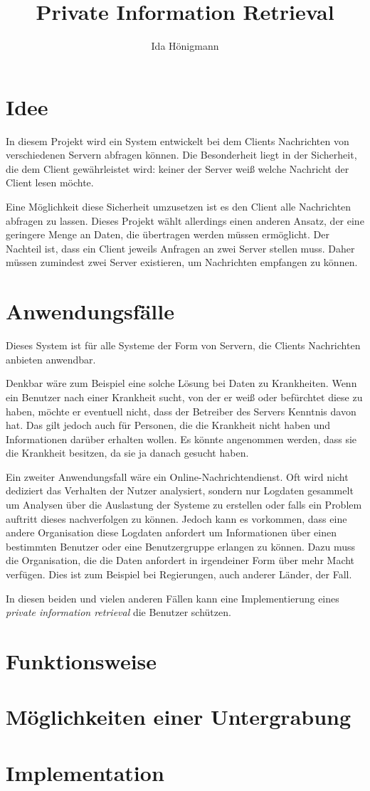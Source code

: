 \documentclass[]{article}
\title{Private Information Retrieval}
\author{Ida Hönigmann}
\begin{document}
\maketitle

\begin{abstract}

\end{abstract}

\section{Idee}
In diesem Projekt wird ein System entwickelt bei dem Clients Nachrichten von verschiedenen Servern abfragen können. Die Besonderheit liegt in der Sicherheit, die dem Client gewährleistet wird: keiner der Server weiß welche Nachricht der Client lesen möchte.

Eine Möglichkeit diese Sicherheit umzusetzen ist es den Client alle Nachrichten abfragen zu lassen. Dieses Projekt wählt allerdings einen anderen Ansatz, der eine geringere Menge an Daten, die übertragen werden müssen ermöglicht. Der Nachteil ist, dass ein Client jeweils Anfragen an zwei Server stellen muss. Daher müssen zumindest zwei Server existieren, um Nachrichten empfangen zu können.

\section{Anwendungsfälle}
Dieses System ist für alle Systeme der Form von Servern, die Clients Nachrichten anbieten anwendbar.

Denkbar wäre zum Beispiel eine solche Lösung bei Daten zu Krankheiten. Wenn ein Benutzer nach einer Krankheit sucht, von der er weiß oder befürchtet diese zu haben, möchte er eventuell nicht, dass der Betreiber des Servers Kenntnis davon hat. Das gilt jedoch auch für Personen, die die Krankheit nicht haben und Informationen darüber erhalten wollen. Es könnte angenommen werden, dass sie die Krankheit besitzen, da sie ja danach gesucht haben.

Ein zweiter Anwendungsfall wäre ein Online-Nachrichtendienst. Oft wird nicht dediziert das Verhalten der Nutzer analysiert, sondern nur Logdaten gesammelt um Analysen über die Auslastung der Systeme zu erstellen oder falls ein Problem auftritt dieses nachverfolgen zu können. Jedoch kann es vorkommen, dass eine andere Organisation diese Logdaten anfordert um Informationen über einen bestimmten Benutzer oder eine Benutzergruppe erlangen zu können. Dazu muss die Organisation, die die Daten anfordert in irgendeiner Form über mehr Macht verfügen. Dies ist zum Beispiel bei Regierungen, auch anderer Länder, der Fall.

In diesen beiden und vielen anderen Fällen kann eine Implementierung eines \textit{private information retrieval} die Benutzer schützen.

\section{Funktionsweise}

\section{Möglichkeiten einer Untergrabung}

\section{Implementation}
\end{document}
